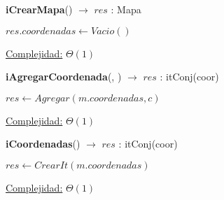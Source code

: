 \begin{Algoritmos}

\medskip
	
  	\medskip
  
\begin{algorithm}[H]{\textbf{iCrearMapa}() $\to$ $res$ : Mapa}
    	\begin{algorithmic}[1]
			\State $res.coordenadas \gets Vacio()$ 
			
			\medskip
			\Statex \underline{Complejidad:} $\Theta(1)$
    	\end{algorithmic}
\end{algorithm}

\begin{algorithm}[H]{\textbf{iAgregarCoordenada}(, ) $\to$ $res$ : itConj(coor)}
    	\begin{algorithmic}[1]
			\State $res \gets Agregar(m.coordenadas, c)$ 
			
			\medskip
			\Statex \underline{Complejidad:} $\Theta(1)$
    	\end{algorithmic}
\end{algorithm}

\begin{algorithm}[H]{\textbf{iCoordenadas}() $\to$ $res$ : itConj(coor)}
    	\begin{algorithmic}[1]
			\State $res \gets CrearIt(m.coordenadas)$ 
			
			\medskip
			\Statex \underline{Complejidad:} $\Theta(1)$
    	\end{algorithmic}
\end{algorithm}

\end{Algoritmos}